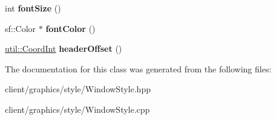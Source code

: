 \begin{DoxyCompactItemize}
\item 
\hypertarget{classgraphics_1_1_window_style_a0525d0a1a4b65add9aa42d82d8b870a0}{int {\bfseries font\-Size} ()}\label{classgraphics_1_1_window_style_a0525d0a1a4b65add9aa42d82d8b870a0}

\item 
\hypertarget{classgraphics_1_1_window_style_af1f409b853e49a7cd36253a93157ae93}{sf\-::\-Color $\ast$ {\bfseries font\-Color} ()}\label{classgraphics_1_1_window_style_af1f409b853e49a7cd36253a93157ae93}

\item 
\hypertarget{classgraphics_1_1_window_style_af95b260deedc435586319baa14055739}{\hyperlink{classutil_1_1_coordinates}{util\-::\-Coord\-Int} {\bfseries header\-Offset} ()}\label{classgraphics_1_1_window_style_af95b260deedc435586319baa14055739}

\end{DoxyCompactItemize}


The documentation for this class was generated from the following files\-:\begin{DoxyCompactItemize}
\item 
client/graphics/style/Window\-Style.\-hpp\item 
client/graphics/style/Window\-Style.\-cpp\end{DoxyCompactItemize}
